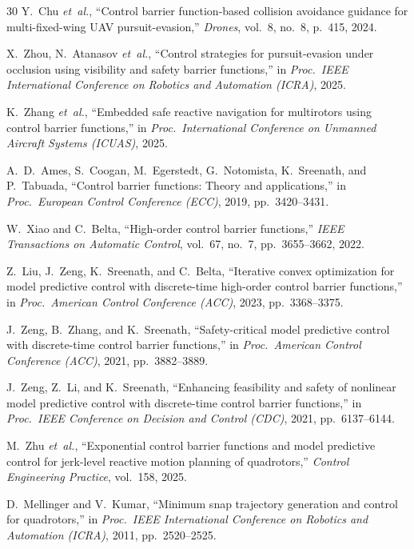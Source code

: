 \documentclass[lettersize,journal]{IEEEtran}
\theoremstyle{definition}
\theoremstyle{remark}
\begin{document}
\begin{thebibliography}{30}
Y.~Chu \emph{et~al.},
``Control barrier function-based collision avoidance guidance for
  multi-fixed-wing UAV pursuit-evasion,''
\emph{Drones}, vol.~8, no.~8, p.~415, 2024.

X.~Zhou, N.~Atanasov \emph{et~al.},
``Control strategies for pursuit-evasion under occlusion using visibility
  and safety barrier functions,''
in \emph{Proc.\ IEEE International Conference on Robotics and
  Automation (ICRA)}, 2025.

K.~Zhang \emph{et~al.},
``Embedded safe reactive navigation for multirotors using control barrier
  functions,''
in \emph{Proc.\ International Conference on Unmanned Aircraft Systems
  (ICUAS)}, 2025.

A.~D.~Ames, S.~Coogan, M.~Egerstedt, G.~Notomista, K.~Sreenath,
  and P.~Tabuada,
``Control barrier functions: Theory and applications,''
in \emph{Proc.\ European Control Conference (ECC)}, 2019, pp.~3420--3431.

W.~Xiao and C.~Belta,
``High-order control barrier functions,''
\emph{IEEE Transactions on Automatic Control},
vol.~67, no.~7, pp.~3655--3662, 2022.

Z.~Liu, J.~Zeng, K.~Sreenath, and C.~Belta,
``Iterative convex optimization for model predictive control with
  discrete-time high-order control barrier functions,''
in \emph{Proc.\ American Control Conference (ACC)}, 2023, pp.~3368--3375.

J.~Zeng, B.~Zhang, and K.~Sreenath,
``Safety-critical model predictive control with discrete-time control
  barrier functions,''
in \emph{Proc.\ American Control Conference (ACC)}, 2021, pp.~3882--3889.

J.~Zeng, Z.~Li, and K.~Sreenath,
``Enhancing feasibility and safety of nonlinear model predictive control
  with discrete-time control barrier functions,''
in \emph{Proc.\ IEEE Conference on Decision and Control (CDC)},
2021, pp.~6137--6144.

M.~Zhu \emph{et~al.},
``Exponential control barrier functions and model predictive control for
  jerk-level reactive motion planning of quadrotors,''
\emph{Control Engineering Practice}, vol.~158, 2025.

D.~Mellinger and V.~Kumar,
``Minimum snap trajectory generation and control for quadrotors,''
in \emph{Proc.\ IEEE International Conference on Robotics and
  Automation (ICRA)}, 2011, pp.~2520--2525.


\end{thebibliography}
\end{document}
